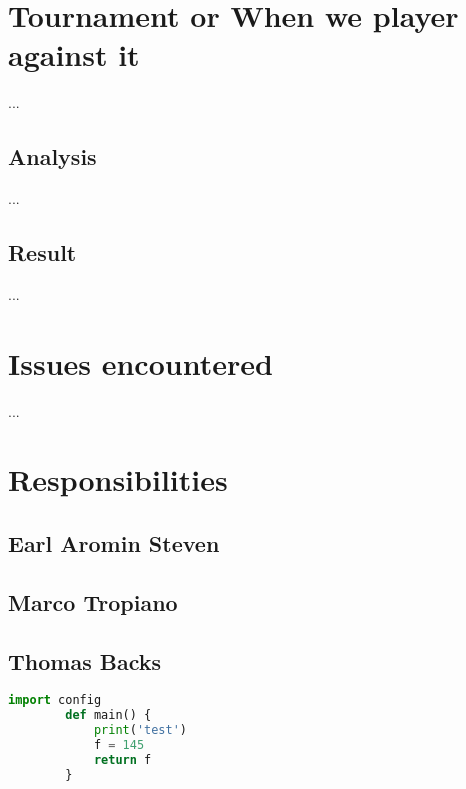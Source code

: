 \documentclass[runningheads]{llncs}
\begin{document}
\section{Tournament or When we player against it}
...
\subsection{Analysis}
...
\subsection{Result}
...

\section{Issues encountered}
...
\section{Responsibilities}
\subsection{Earl Aromin Steven}
\subsection{Marco Tropiano}
\subsection{Thomas Backs}
\begin{mdframed}[backgroundcolor=light-gray,roundcorner=10pt,leftmargin=1, rightmargin=1, innerleftmargin=15, innertopmargin=15,innerbottommargin=15, outerlinewidth=1, linecolor=light-gray]
    \begin{lstlisting}[language=Python]
        import config
        def main() {
            print('test')
            f = 145
            return f
        }
        
    \end{lstlisting}
\end{mdframed}

    
\end{document}

